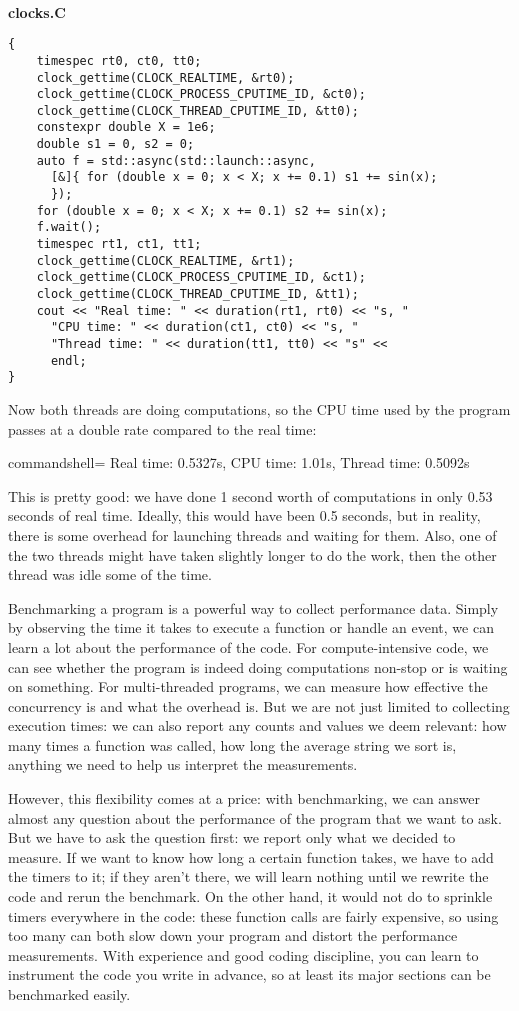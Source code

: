 \hspace*{\fill} \\ %
\noindent
\textbf{clocks.C}
\begin{lstlisting}[style=styleCXX]
{
	timespec rt0, ct0, tt0;
	clock_gettime(CLOCK_REALTIME, &rt0);
	clock_gettime(CLOCK_PROCESS_CPUTIME_ID, &ct0);
	clock_gettime(CLOCK_THREAD_CPUTIME_ID, &tt0);
	constexpr double X = 1e6;
	double s1 = 0, s2 = 0;
	auto f = std::async(std::launch::async,
	  [&]{ for (double x = 0; x < X; x += 0.1) s1 += sin(x);
	  });
	for (double x = 0; x < X; x += 0.1) s2 += sin(x);
	f.wait();
	timespec rt1, ct1, tt1;
	clock_gettime(CLOCK_REALTIME, &rt1);
	clock_gettime(CLOCK_PROCESS_CPUTIME_ID, &ct1);
	clock_gettime(CLOCK_THREAD_CPUTIME_ID, &tt1);
	cout << "Real time: " << duration(rt1, rt0) << "s, "
	  "CPU time: " << duration(ct1, ct0) << "s, "
	  "Thread time: " << duration(tt1, tt0) << "s" <<
	  endl;
}
\end{lstlisting}

Now both threads are doing computations, so the CPU time used by the program passes at a double rate compared to the real time:

\begin{tcblisting}{commandshell={}}
Real time: 0.5327s, CPU time: 1.01s, Thread time: 0.5092s
\end{tcblisting}

This is pretty good: we have done 1 second worth of computations in only 0.53 seconds of real time. Ideally, this would have been 0.5 seconds, but in reality, there is some overhead for launching threads and waiting for them. Also, one of the two threads might have taken slightly longer to do the work, then the other thread was idle some of the time.

Benchmarking a program is a powerful way to collect performance data. Simply by observing the time it takes to execute a function or handle an event, we can learn a lot about the performance of the code. For compute-intensive code, we can see whether the program is indeed doing computations non-stop or is waiting on something. For multi-threaded programs, we can measure how effective the concurrency is and what the overhead is. But we are not just limited to collecting execution times: we can also report any counts and values we deem relevant: how many times a function was called, how long the average string we sort is, anything we need to help us interpret the measurements.

However, this flexibility comes at a price: with benchmarking, we can answer almost any question about the performance of the program that we want to ask. But we have to ask the question first: we report only what we decided to measure. If we want to know how long a certain function takes, we have to add the timers to it; if they aren't there, we will learn nothing until we rewrite the code and rerun the benchmark. On the other hand, it would not do to sprinkle timers everywhere in the code: these function calls are fairly expensive, so using too many can both slow down your program and distort the performance measurements. With experience and good coding discipline, you can learn to instrument the code you write in advance, so at least its major sections can be benchmarked easily.

